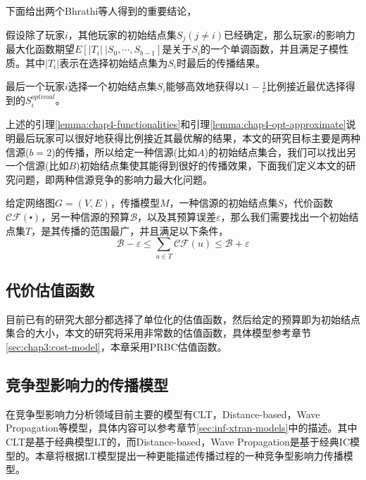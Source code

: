 下面给出两个Bhrathi\cite{bharathi2007competitive}等人得到的重要结论，
\begin{lemma}
\label{lemma:chap4-functionalities}
假设除了玩家$i$，其他玩家的初始结点集$S_{j}(j \neq i)$已经确定，那么玩家$i$的影响力最大化函数期望$E[|T_{i}|~|S_{0},\cdots ,S_{b-1}]$是关于$S_{i}$的一个单调函数，并且满足子模性质。其中$|T_{i}|$表示在选择初始结点集为$S_{i}$时最后的传播结果。
\end{lemma}

\begin{lemma}
\label{lemma:chap4-opt-approximate}
最后一个玩家$i$选择一个初始结点集$S_{i}$能够高效地获得以$1-\frac{1}{e}$比例接近最优选择得到的$S_{i}^{optimal}$。
\end{lemma}

上述的引理\ref{lemma:chap4-functionalities}和引理\ref{lemma:chap4-opt-approximate}说明最后玩家可以很好地获得比例接近其最优解的结果，本文的研究目标主要是两种信源($b=2$)的传播，所以给定一种信源(比如$A$)的初始结点集合，我们可以找出另一个信源(比如$B$)初始结点集使其能得到很好的传播效果，下面我们定义本文的研究问题，即两种信源竞争的影响力最大化问题。
\begin{definition}
\label{def:chap4-self-on-cim}
给定网络图$G=(V,E)$，传播模型$M$，一种信源的初始结点集$S$，代价函数$\mathcal{CF}(\centerdot)$，另一种信源的预算$\mathcal{B}$，以及其预算误差$\varepsilon$，那么我们需要找出一个初始结点集$T$，是其传播的范围最广，并且满足以下条件，
\begin{displaymath}
\mathcal{B} - \varepsilon \leq \sum_{u \in T}\mathcal{CF}(u) \leq \mathcal{B} + \varepsilon
\end{displaymath}
\end{definition}

\subsection{代价估值函数}
目前已有的研究大部分都选择了单位化的估值函数，然后给定的预算即为初始结点集合的大小，本文的研究将采用非常数的估值函数，具体模型参考章节\ref{sec:chap3:cost-model}，本章采用PRBC估值函数。


\subsection{竞争型影响力的传播模型}
在竞争型影响力分析领域目前主要的模型有CLT，Distance-based，Wave Propagation等模型，具体内容可以参考章节\ref{sec:inf-xtran-models}中的描述。其中CLT是基于经典模型LT的，而Distance-based，Wave Propagation是基于经典IC模型的。本章将根据LT模型提出一种更能描述传播过程的一种竞争型影响力传播模型。


